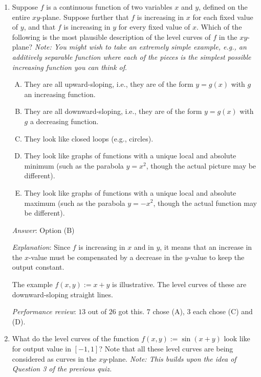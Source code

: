 \documentclass[10pt]{amsart}
\begin{document}
\begin{enumerate}
  (iii): Similar reasoning as with (ii).

  {\em Performance review}: $12$ out of $26$ got this. $7$ chose (A),
  $6$ chose (E), $1$ chose (B).

\item Suppose $f$ is a continuous function of two variables $x$ and
  $y$, defined on the entire $xy$-plane. Suppose further that $f$ is
  increasing in $x$ for each fixed value of $y$, and that $f$ is
  increasing in $y$ for every fixed value of $x$. Which of the
  following is the most plausible description of the level curves of
  $f$ in the $xy$-plane? {\em Note: You might wish to take an
  extremely simple example, e.g., an additively separable function
  where each of the pieces is the simplest possible increasing
  function you can think of}.

  \begin{enumerate}[(A)]
  \item They are all upward-sloping, i.e., they are of the form $y =
    g(x)$ with $g$ an increasing function.
    \item They are all downward-sloping, i.e., they are of the form $y
      = g(x)$ with $g$ a decreasing function.
    \item They look like closed loops (e.g., circles).
    \item They look like graphs of functions with a unique local and
      absolute minimum (such as the parabola $y = x^2$, though the
      actual picture may be different).
    \item They look like graphs of functions with a unique local and
      absolute maximum (such as the parabola $y = -x^2$, though the
      actual function may be different).
  \end{enumerate}

  {\em Answer}: Option (B)

  {\em Explanation}: Since $f$ is increasing in $x$ and in $y$, it
  means that an increase in the $x$-value must be compensated by a
  decrease in the $y$-value to keep the output constant.

  The example $f(x,y) := x + y$ is illustrative. The level curves of
  these are downward-sloping straight lines.

  {\em Performance review}: $13$ out of $26$ got this. $7$ chose (A),
  $3$ each chose (C) and (D).
\item What do the level curves of the function $f(x,y) := \sin(x + y)$
  look like for output value in $[-1,1]$? Note that all these level
  curves are being considered as curves in the $xy$-plane. {\em Note:
  This builds upon the idea of Question 3 of the previous quiz.}


\end{enumerate}
\end{document}
